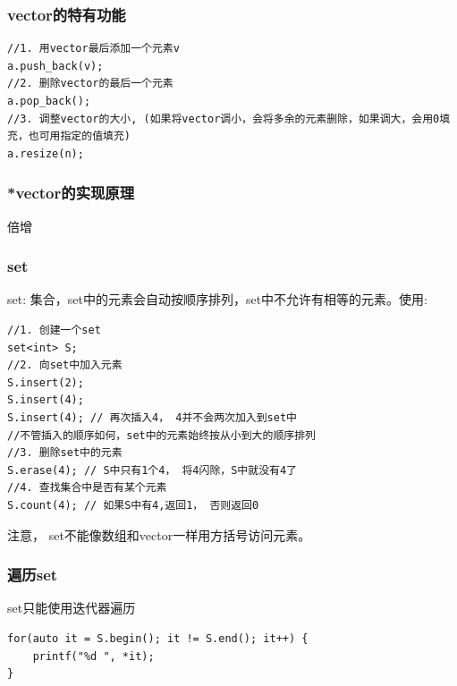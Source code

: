 \documentclass{beamer}
\begin{document}
\begin{frame}[fragile]
    \frametitle{vector的特有功能}
    \begin{lstlisting}
//1. 用vector最后添加一个元素v
a.push_back(v);
//2. 删除vector的最后一个元素
a.pop_back();
//3. 调整vector的大小, (如果将vector调小，会将多余的元素删除，如果调大，会用0填充，也可用指定的值填充)
a.resize(n); 

    \end{lstlisting}

\end{frame}


\begin{frame}
    \frametitle{*vector的实现原理}
    倍增
\end{frame}


\begin{frame}[fragile]
    \frametitle{set}
set: 集合，set中的元素会自动按顺序排列，set中不允许有相等的元素。使用:\\
\begin{lstlisting}
//1. 创建一个set
set<int> S;
//2. 向set中加入元素
S.insert(2);
S.insert(4);
S.insert(4); // 再次插入4， 4并不会两次加入到set中
//不管插入的顺序如何，set中的元素始终按从小到大的顺序排列
//3. 删除set中的元素
S.erase(4); // S中只有1个4， 将4闪除，S中就没有4了
//4. 查找集合中是否有某个元素
S.count(4); // 如果S中有4,返回1， 否则返回0
\end{lstlisting}
注意， set不能像数组和vector一样用方括号访问元素。

\end{frame}

\begin{frame}[fragile]
    \frametitle{遍历set}
    set只能使用迭代器遍历
    \begin{lstlisting}
for(auto it = S.begin(); it != S.end(); it++) {
    printf("%d ", *it);
}

    \end{lstlisting}

    

\end{frame}
\end{document}
